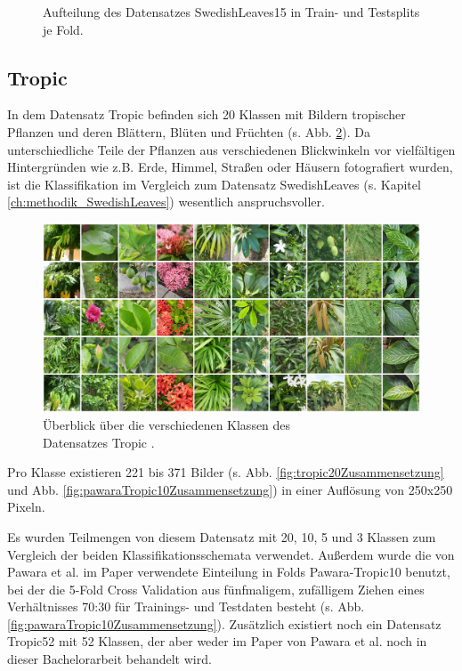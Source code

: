 \begin{figure}[H]
\begin{adjustbox}{width=1.4\textwidth, center}

\end{adjustbox}
\caption{Aufteilung des Datensatzes SwedishLeaves15 \cite{swedishLeaves} in Train- und Testsplits je Fold.}
\label{fig:swedishLeavesZusammensetzung}
\end{figure}
\newpage
\subsection{Tropic}
\label{ch:methodik_Tropic}
In dem Datensatz Tropic \cite{pawaraWebsiteDatensaetze} befinden sich 20 Klassen mit Bildern tropischer Pflanzen und deren Blättern, Blüten und Früchten (s. Abb. \ref{fig:tropicUeberblick}). Da unterschiedliche Teile der Pflanzen aus verschiedenen Blickwinkeln vor vielfältigen Hintergründen wie z.B. Erde, Himmel, Straßen oder Häusern fotografiert wurden, ist die Klassifikation im Vergleich zum Datensatz SwedishLeaves \cite{swedishLeaves} (s. Kapitel \ref{ch:methodik_SwedishLeaves}) wesentlich anspruchsvoller.


\begin{figure}[H]
\centering
\includegraphics[scale=0.14]{img/2_tropic10-image.jpg}
\caption{Überblick über die verschiedenen Klassen des\\
Datensatzes Tropic \cite{pawaraTropic}.}
\label{fig:tropicUeberblick}
\end{figure}

Pro Klasse existieren 221 bis 371 Bilder (s. Abb. \ref{fig:tropic20Zusammensetzung} und Abb. \ref{fig:pawaraTropic10Zusammensetzung}) in einer Auflösung von 250x250 Pixeln.

Es wurden Teilmengen von diesem Datensatz mit 20, 10, 5 und 3 Klassen zum Vergleich der beiden Klassifikationsschemata verwendet. Außerdem wurde die von Pawara et al. im Paper \cite{pawaraPaper} verwendete Einteilung in Folds Pawara-Tropic10 \cite{pawaraWebsiteDatensaetze} benutzt, bei der die 5-Fold Cross Validation aus fünfmaligem, zufälligem Ziehen eines Verhältnisses 70:30 für Trainings- und Testdaten besteht (s. Abb. \ref{fig:pawaraTropic10Zusammensetzung}).
Zusätzlich existiert noch ein Datensatz Tropic52 \cite{pawaraWebsiteDatensaetze} mit 52 Klassen, der aber weder im Paper von Pawara et al. \cite{pawaraPaper} noch in dieser Bachelorarbeit behandelt wird.

